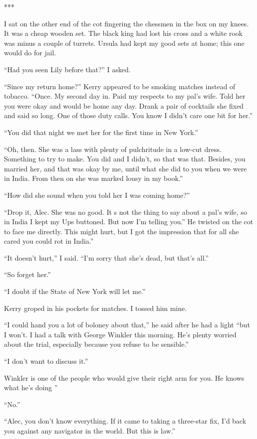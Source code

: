 {***

I sat on the other end of the cot fingering the chessmen in the box on my knees. It was a cheap wooden set. The black king had lost his cross and a white rook was minus a couple of turrets. Ursula had kept my good sets at home; this one would do for jail.

“Had you seen Lily before that?” I asked.

“Since my return home?” Kerry appeared to be smoking matches instead of tobacco. “Once. My second day in. Paid my respects to my pal’s wife. Told her you were okay and would be home any day. Drank a pair of cocktails she fixed and said so long. One of those duty calls. You know I didn’t care one bit for her.”

“You did that night we met her for the first time in New York.”

“Oh, then. She was a lass with plenty of pulchritude in a low-cut dress. Something to try to make. You did and I didn’t, so that was that. Besides, you married her, and that was okay by me, until what she did to you when we were in India. From then on she was marked lousy in my book.”

“How did she sound when you told her I was coming home?”

“Drop it, Alec. She was no good. It s not the thing to say about a pal’s wife, so in India I kept my Ups buttoned. But now I’m telling you.” He twisted on the cot to face me directly. This might hurt, but I got the impression that for all she cared you could rot in India.”

“It doesn’t hurt,” I said. “I’m sorry that she’s dead, but that’s all.”

“So forget her.”

“I doubt if the State of New York will let me.”

Kerry groped in his pockets for matches. I tossed him mine.

“I could hand you a lot of boloney about that,” he said after he had a light “but I won’t. I had a talk with George Winkler this morning. He’s plenty worried about the trial, especially because you refuse to be sensible.”

“I don’t want to discuss it.”

Winkler is one of the people who would give their right arm for you. He knows what he’s doing ”

“No.”

“Alec, you don’t know everything. If it came to taking a three-star fix, I’d back you against any navigator in the world. But this is law.”

}
